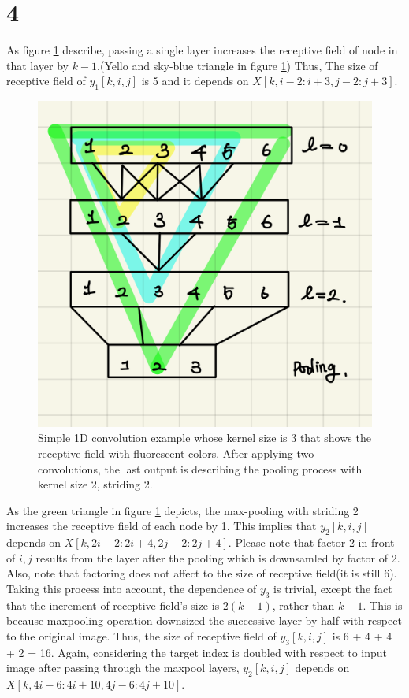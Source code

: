 \documentclass[10pt]{article}
\begin{document}
\section*{4}
As figure \ref{fig1} describe, passing a single layer increases the receptive field of node in that layer by $k-1$.(Yello and sky-blue triangle in figure \ref{fig1}) Thus, 
The size of receptive field of $y_1[k,i,j]$ is 5 and it depends on $X[k,i-2:i+3,j-2:j+3]$.
\begin{figure}[!h]
    \begin{center}
        \includegraphics[scale = 0.2]{./fig/image.png}
    \end{center}
    \caption{Simple 1D convolution example whose kernel size is 3 that shows the receptive field with fluorescent colors. After applying two convolutions, the last output is describing the pooling process with kernel size 2, striding 2.}
    \label{fig1}
\end{figure}
As the green triangle in figure \ref{fig1} depicts, the max-pooling with striding 2 increases the receptive field of each node by 1. This implies that $y_2[k,i,j]$ depends on $X[k,2i-2:2i+4,2j-2:2j+4]$.
Please note that factor 2 in front of $i,j$ results from the layer after the pooling which is downsamled by factor of 2. Also, note that factoring does not affect to the size of receptive field(it is still 6).
Taking this process into account, the dependence of $y_3$ is trivial, except the fact that the increment of receptive field's size is $2(k-1)$, rather than $k-1$. This is because maxpooling operation downsized the successive layer by half with respect to the original image. 
Thus, the size of receptive field of $y_3[k,i,j]$ is 6 + 4 + 4 + 2 = 16. Again, considering the target index is doubled with respect to input image after passing through the maxpool layers, $y_2[k,i,j]$ depends on $X[k,4i-6:4i+10,4j-6:4j+10]$.
\end{document}
